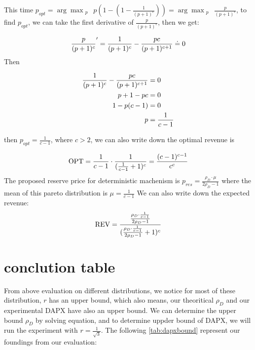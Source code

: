 This time $p_{opt} =\displaystyle\arg \max_{\substack{p}} \  p(1 - (1-\frac{1}{(p+1)^c})) =\displaystyle\arg \max_{\substack{p}} \  \frac{p}{(p+1)^c}$, to find $p_{opt}$, we can take the first derivative of  $\frac{p}{(p+1)^c}$, then we get:

\begin{equation}\notag
	\frac{p}{(p+1)^c}' = \frac{1}{(p+1)^c} - \frac{pc}{(p+1)^{c+1}}\doteq 0
\end{equation} 
Then

\begin{equation}\notag
	\begin{split}	
		\frac{1}{(p+1)^c} - \frac{pc}{(p+1)^{c+1}} &=0\\ p + 1 - pc&= 0\\ 1 - p(c-1)&=0\\  p&=\frac{1}{c-1}
	\end{split}
\end{equation} 

then $p_{opt} = \frac{1}{c-1}$, where $c > 2$, we can also write down the optimal revenue is

\begin{equation}\notag
	\text{OPT} =  \frac{1}{c-1} \cdot \frac{1}{(\frac{1}{c-1}+1)^c} = \frac{(c-1)^{c-1}}{c^c}
\end{equation}
The proposed reserve price for deterministic machenism is $p_{res} = \frac{\rho_{D} \cdot \mu}{2\rho_{D} -1} $ where the mean of this pareto distribution is $\mu = \frac{1}{c-1}$
We can also write down the expected revenue:
\begin{equation}\notag
 \text{REV} =\frac{\frac{\rho_{D} \cdot  \frac{1}{c-1}}{2\rho_{D} -1}}{(\frac{\rho_{D} \cdot  \frac{1}{c-1}}{2\rho_{D} -1} + 1)^c} 
\end{equation} 


\section{conclution table}
From above evaluation on different distributions, we notice for most of these distribution, $r$ has an upper bound, which also means, our theoritical $\rho_D$  and our experimental DAPX have also an upper bound. We can determine the upper bound $\rho_D$ by solving equation, and to determine uppder bound of DAPX, we will run the experiment with $r = \frac{1}{\sqrt{3}}$. The following \cref{tab:dapxbound} represent our foundings from our evaluation: 

